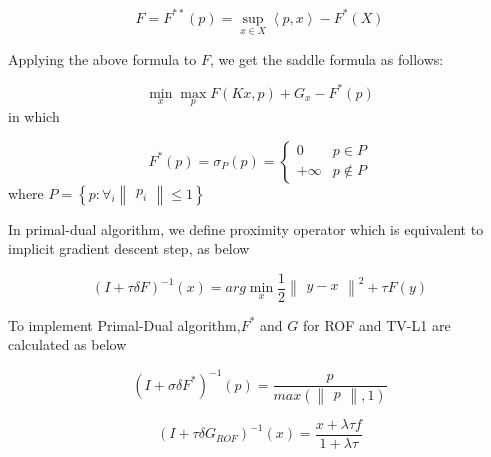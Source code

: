\begin{equation}
    \label{eq:tvl1_denoise_general_min_energy_dual_dual}
    F = F^{**}\left(p\right) = \sup_{x \in X}\left<p, x\right> - F^{*}\left(X\right)
\end{equation}

Applying the above formula to $F$, we get the saddle formula as follows:

\begin{equation}
    \label{eq:tvl1_denoise_general_min_energy_saddle}
    \min_{x}\max_{p}  F\left(Kx, p\right) + G_{x} - F^{*}\left(p\right)
    \end{equation}
in which

\begin{equation}
    \label{eq:tvl1_denoise_general_min_energy_dual_ff}
    F^{*}\left(p\right) = \sigma_{P}\left(p\right) = \left\{\begin{matrix}
    0 & p \in P \\ 
    +\infty & p \notin P 
    \end{matrix}\right.
\end{equation}
where $P = \left\{ p: \forall_{i}\begin{Vmatrix}p_{i}\end{Vmatrix}\leq 1 \right\} $

In primal-dual algorithm, we define proximity operator which is equivalent to implicit gradient descent step, as below

\begin{equation}
    \label{eq:tvl1_denoise_general_proximity}
    \left(I + \tau \delta F\right)^{-1}\left(x\right)=arg\min_{x}\frac{1}{2}\begin{Vmatrix}y - x\end{Vmatrix}^{2} + \tau F\left(y\right)
\end{equation}

To implement Primal-Dual algorithm,$F^{*}$ and $G$ for ROF and TV-L1 are calculated as below

\begin{equation}
    \label{eq:tvl1_denoise_general_f_tilde}
    \left(I + \sigma \delta F^{*}\right)^{-1}\left(p\right) = \frac{p}{max\left(\begin{Vmatrix}p\end{Vmatrix}, 1 \right)}
\end{equation}

\begin{equation}
    \label{eq:tvl1_denoise_general_g_rof_tilde}
    \left(I + \tau \delta G_{ROF}\right)^{-1}\left(x\right) = \frac{x + \lambda \tau f}{1 + \lambda \tau}
\end{equation}

